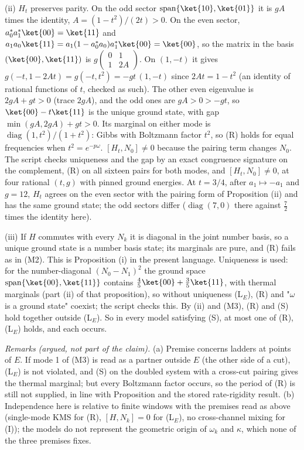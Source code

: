 (ii) $H_{t}$ preserves parity. On the odd sector $\operatorname{span}\{\ket{10}, \ket{01}\}$ it is $gA$ times the identity, $A = (1 - t^{2})/(2t) > 0$. On the even sector, $a_{0}^{*}a_{1}^{*}\ket{00} = \ket{11}$ and $a_{1}a_{0}\ket{11} = a_{1}(1 - a_{0}^{*}a_{0})a_{1}^{*}\ket{00} = \ket{00}$, so the matrix in the basis $(\ket{00}, \ket{11})$ is $g\left(\begin{smallmatrix}0 & 1\\ 1 & 2A\end{smallmatrix}\right)$. On $(1, -t)$ it gives $g(-t, 1 - 2At) = g(-t, t^{2}) = -gt\,(1, -t)$ since $2At = 1 - t^{2}$ (an identity of rational functions of $t$, checked as such). The other even eigenvalue is $2gA + gt > 0$ (trace $2gA$), and the odd ones are $gA > 0 > -gt$, so $\ket{00} - t\ket{11}$ is the unique ground state, with gap $\min(gA, 2gA) + gt > 0$. Its marginal on either mode is $\operatorname{diag}(1, t^{2})/(1 + t^{2})$: Gibbs with Boltzmann factor $t^{2}$, so (R) holds for equal frequencies when $t^{2} = e^{-p\omega}$. $[H_{t}, N_{0}] \ne 0$ because the pairing term changes $N_{0}$. The script checks uniqueness and the gap by an exact congruence signature on the complement, (R) on all sixteen pairs for both modes, and $[H_{t}, N_{0}] \ne 0$, at four rational $(t, g)$ with pinned ground energies. At $t = 3/4$, after $a_{1} \mapsto -a_{1}$ and $g = 12$, $H_{t}$ agrees on the even sector with the pairing form of Proposition (ii) and has the same ground state; the odd sectors differ ($\operatorname{diag}(7, 0)$ there against $\tfrac72$ times the identity here).

(iii) If $H$ commutes with every $N_{k}$ it is diagonal in the joint number basis, so a unique ground state is a number basis state; its marginals are pure, and (R) fails as in (M2). This is Proposition (i) in the present language. Uniqueness is used: for the number-diagonal $(N_{0} - N_{1})^{2}$ the ground space $\operatorname{span}\{\ket{00}, \ket{11}\}$ contains $\tfrac45\ket{00} + \tfrac35\ket{11}$, with thermal marginals (part (ii) of that proposition), so without uniqueness (L$_E$), (R) and "$\omega$ is a ground state" coexist; the script checks this. By (ii) and (M3), (R) and (S) hold together outside (L$_E$). So in every model satisfying (S), at most one of (R), (L$_E$) holds, and each occurs.

\emph{Remarks (argued, not part of the claim).} (a) Premise  concerns ladders at points of $E$. If mode 1 of (M3) is read as a partner outside $E$ (the other side of a cut), (L$_E$) is not violated, and (S) on the doubled system with a cross-cut pairing gives the thermal marginal; but every Boltzmann factor occurs, so the period of (R) is still not supplied, in line with Proposition  and the stored rate-rigidity result. (b) Independence here is relative to finite windows with the premises read as above (single-mode KMS for (R), $[H, N_{k}] = 0$ for (L$_E$), no cross-channel mixing for (I)); the models do not represent the geometric origin of $\omega_{k}$ and $\kappa$, which none of the three premises fixes.
